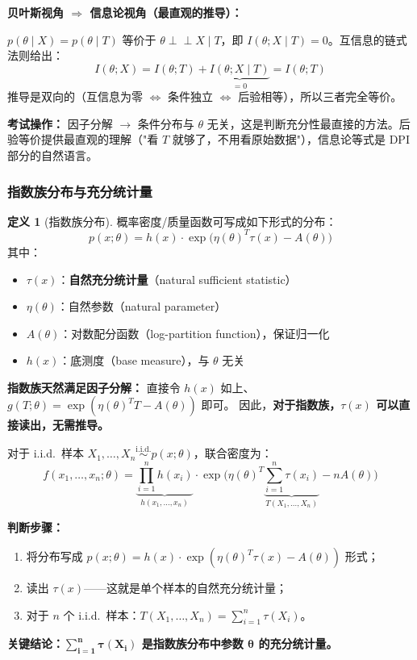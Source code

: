 \documentclass[12pt,a4paper]{ctexart}
\theoremstyle{definition}
\newtheorem{definition}[theorem]{定义}
\newcommand{\iid}{\overset{\text{i.i.d.}}{\sim}}
\begin{document}
\textbf{贝叶斯视角 $\Rightarrow$ 信息论视角（最直观的推导）：}

$p(\theta \mid X) = p(\theta \mid T)$ 等价于 $\theta \perp\!\!\!\perp X \mid T$，即 $I(\theta; X \mid T) = 0$。互信息的链式法则给出：
\[
I(\theta; X) = I(\theta; T) + \underbrace{I(\theta; X \mid T)}_{=0} = I(\theta; T)
\]
推导是双向的（互信息为零 $\iff$ 条件独立 $\iff$ 后验相等），所以三者完全等价。

\textbf{考试操作：} 因子分解 $\to$ 条件分布与 $\theta$ 无关，这是判断充分性最直接的方法。后验等价提供最直观的理解（"看 $T$ 就够了，不用看原始数据"），信息论等式是 DPI 部分的自然语言。

\subsubsection{指数族分布与充分统计量}

\begin{definition}[指数族分布]
概率密度/质量函数可写成如下形式的分布：
\[
p(x; \theta) = h(x) \cdot \exp\!\Big(\eta(\theta)^T \tau(x) - A(\theta)\Big)
\]
其中：
\begin{itemize}[nosep]
  \item $\tau(x)$：\textbf{自然充分统计量}（natural sufficient statistic）
  \item $\eta(\theta)$：自然参数（natural parameter）
  \item $A(\theta)$：对数配分函数（log-partition function），保证归一化
  \item $h(x)$：底测度（base measure），与 $\theta$ 无关
\end{itemize}
\end{definition}

\textbf{指数族天然满足因子分解：} 直接令 $h(x)$ 如上、$g(T;\theta) = \exp(\eta(\theta)^T T - A(\theta))$ 即可。
因此，\textbf{对于指数族，$\tau(x)$ 可以直接读出，无需推导。}

\begin{keybox}[指数族的充分统计量判断方法]
对于 i.i.d.\ 样本 $X_1,\ldots,X_n \iid p(x;\theta)$，联合密度为：
\[
f(x_1,\ldots,x_n; \theta)
= \underbrace{\textstyle\prod_{i=1}^{n} h(x_i)}_{h(x_1,\ldots,x_n)}
\cdot \exp\!\Big(\eta(\theta)^T \underbrace{\textstyle\sum_{i=1}^{n} \tau(x_i)}_{T(X_1,\ldots,X_n)} - n A(\theta)\Big)
\]

\textbf{判断步骤：}
\begin{enumerate}[nosep]
  \item 将分布写成 $p(x;\theta) = h(x) \cdot \exp(\eta(\theta)^T \tau(x) - A(\theta))$ 形式；
  \item 读出 $\tau(x)$——这就是单个样本的自然充分统计量；
  \item 对于 $n$ 个 i.i.d.\ 样本：$T(X_1,\ldots,X_n) = \sum_{i=1}^{n} \tau(X_i)$。
\end{enumerate}
\textbf{关键结论：$\boldsymbol{\sum_{i=1}^{n} \tau(X_i)}$ 是指数族分布中参数 $\boldsymbol{\theta}$ 的充分统计量。}
\end{keybox}
\end{document}
